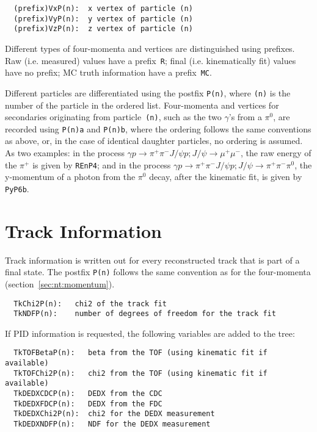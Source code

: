 \documentclass[11pt]{article}
\begin{document}
\begin{verbatim}
  (prefix)VxP(n):  x vertex of particle (n)
  (prefix)VyP(n):  y vertex of particle (n)
  (prefix)VzP(n):  z vertex of particle (n)
\end{verbatim}

Different types of four-momenta and vertices are distinguished using prefixes.  Raw (i.e. measured) values have a prefix~{\tt R}; final (i.e. kinematically fit) values have no prefix; MC truth information have a prefix~{\tt MC}.

Different particles are differentiated using the postfix {\tt P(n)}, where {\tt (n)} is the number of the particle in the ordered list.  Four-momenta and vertices for secondaries originating from particle~{\tt (n)}, such as the two $\gamma$'s from a $\pi^0$, are recorded using {\tt P(n)a} and {\tt P(n)b}, where the ordering follows the same conventions as above, or, in the case of identical daughter particles, no ordering is assumed.  As two examples: in the process $\gamma p \to\pi^+\pi^-J/\psi p; J/\psi\to\mu^+\mu^-$, the raw energy of the $\pi^+$ is given by {\tt REnP4}; and in the process $\gamma p \to \pi^+\pi^-J/\psi p; J/\psi\to\pi^+\pi^-\pi^0$, the y-momentum of a photon from the $\pi^0$ decay, after the kinematic fit, is given by {\tt PyP6b}.




\section{Track Information}
\label{sec:nt:track}

Track information is written out for every reconstructed track that is part of a final state.  The postfix {\tt P(n)} follows the same convention as for the four-momenta (section~\ref{sec:nt:momentum}).
\begin{verbatim}
  TkChi2P(n):   chi2 of the track fit
  TkNDFP(n):    number of degrees of freedom for the track fit
\end{verbatim}

If PID information is requested, the following variables are added to the tree:
\begin{verbatim}
  TkTOFBetaP(n):   beta from the TOF (using kinematic fit if available)
  TkTOFChi2P(n):   chi2 from the TOF (using kinematic fit if available)
  TkDEDXCDCP(n):   DEDX from the CDC
  TkDEDXFDCP(n):   DEDX from the FDC
  TkDEDXChi2P(n):  chi2 for the DEDX measurement
  TkDEDXNDFP(n):   NDF for the DEDX measurement
\end{verbatim}
\end{document}
